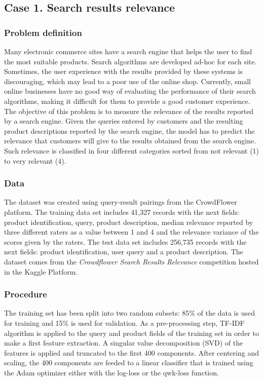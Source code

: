 \subsection{Case 1. Search results relevance}

\subsubsection{Problem definition}

Many electronic commerce sites have a search engine that helps the user to find the most suitable products. Search algorithms are developed ad-hoc for each site. Sometimes, the user experience with the results provided by these systems is discouraging, which may lead to a poor use of the online shop. Currently, small online businesses have no good way of evaluating the performance of their search algorithms, making it difficult for them to provide a good customer experience. The objective of this problem is to measure the relevance of the results reported by a search engine. Given the queries entered by customers and the resulting product descriptions reported by the search engine, the model has to predict the relevance that customers will give to the results obtained from the search engine. Such relevance is classified in four different categories sorted from not relevant (1) to very relevant (4).

\subsubsection{Data}

The dataset was created using query-result pairings from the CrowdFlower platform. The training data set includes 41,327 records with the next fields: product identification, query, product description, median relevance reported by three different raters as a value between 1 and 4 and the relevance variance of the scores given by the raters. The test data set includes 256,735 records with the next fields: product identification, user query and a product description. The dataset comes from the \textit{Crowdflower Search Results Relevance} competition hosted in the Kaggle Platform.

\subsubsection{Procedure}

The training set has been split into two random subsets: 85\% of the data is used for training and 15\% is used for validation. As a pre-processing step, TF-IDF algorithm \citep{Ramos2003UsingTT} is applied to the query and product fields of the training set in order to make a first feature extraction. A singular value decomposition (SVD) of the features is applied and truncated to the first 400 components. After centering and scaling, the 400 components are feeded to a linear classifier that is trained using the Adam optimizer \citep{DBLP:journals/corr/KingmaB14} either with the log-loss or the qwk-loss function. 


